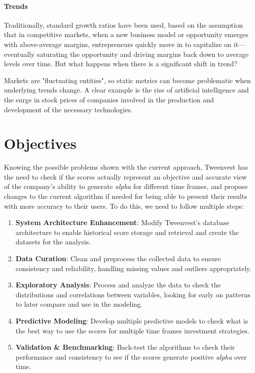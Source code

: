 \documentclass[11pt,english,a4paper,hidelinks]{book}
\begin{document}
\subsubsection{Trends}

\noindent Traditionally, standard growth ratios have been used, based on the assumption that in competitive markets, when a new business model or opportunity emerges with above-average margins, entrepreneurs quickly move in to capitalize on it—eventually saturating the opportunity and driving margins back down to average levels over time. But what happens when there is a significant shift in trend? 

\vspace{0.5cm}
\noindent Markets are "fluctuating entities", so static metrics can become problematic when underlying trends change. A clear example is the rise of artificial intelligence and the surge in stock prices of companies involved in the production and development of the necessary technologies.



\chapter{Objectives}
Knowing the possible problems shown with the current approach, Tweenvest has the need to check if the scores actually represent an objective and accurate view of the company's ability to generate \textit{alpha} for different time frames, and propose changes to the current algorithm if needed for being able to present their results with more accuracy to their users. To do this, we need to follow multiple steps:
\begin{enumerate}
  \item \textbf{System Architecture Enhancement}: Modify Tweenvest's database architecture to enable historical score storage and retrieval and create the datasets for the analysis.
  \item \textbf{Data Curation}: Clean and preprocess the collected data to ensure consistency and reliability, handling missing values and outliers appropriately.
  \item \textbf{Exploratory Analysis}: Process and analyze the data to check the distributions and correlations between variables, looking for early on patterns to later compare and use in the modeling.
  \item \textbf{Predictive Modeling}: Develop multiple predictive models to check what is the best way to use the scores for multiple time frames investment strategies.
  \item \textbf{Validation \& Benchmarking}: Back-test the algorithms to check their performance and consistency to see if the scores generate positive \textit{alpha} over time.
\end{enumerate}
\end{document}
